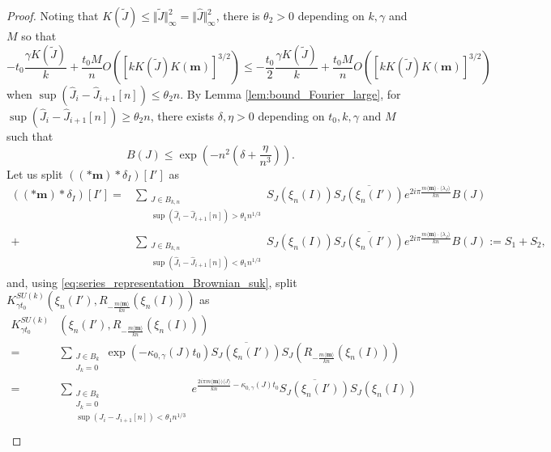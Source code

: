 \documentclass[10pt,11pt]{amsart}%
\begin{document}
\begin{proof}
Noting that $K(\tilde{J})\leq\Vert \tilde{J}\Vert_{\infty}^2=\Vert \hat{J}\Vert_{\infty}^2$, there is $\theta_2>0$ depending on $k,\gamma$ and $M$ so that 
$$-t_0\frac{\gamma K(\tilde{J})}{k}+\frac{t_0M}{n}O\left(\left[kK(\tilde{J})K(\mathbf{m})\right]^{3/2}\right)\leq -\frac{t_0}{2}\frac{\gamma K(\tilde{J})}{k}+\frac{t_0M}{n}O\left(\left[kK(\tilde{J})K(\mathbf{m})\right]^{3/2}\right)$$ 
when $\sup(\hat{J}_{i}-\hat{J}_{i+1} [n])\leq \theta_2n$. By Lemma \ref{lem:bound_Fourier_large}, for $\sup(\hat{J}_{i}-\hat{J}_{i+1} [n])\geq \theta_2n$, there exists $\delta,\eta>0$ depending on $t_0,k,\gamma$ and $M$ such that
\begin{equation}\label{eq:bound_Fourier_large_J}
B(J)\leq   \exp\left(-n^2\left(\delta+ \frac{\eta}{n^3}\right)\right).
\end{equation}
Let us split $\left(\left(\ast \mathbf{m}\right)\ast \delta_I\right)[I']$ as
\begin{align*}
\left(\left(\ast \mathbf{m}\right)\ast \delta_I\right)[I']=&\sum_{\substack{J\in B_{k,n}\\ \sup(\hat{J}_{i}-\hat{J}_{i+1} [n])> \theta_1 n^{1/3}}}S_{J}(\xi_{n}(I))\overline{S_{J}(\xi_{n}(I'))}e^{2i \pi \frac{m\langle\mathbf{m}\rangle\cdot\langle \lambda_J\rangle}{kn}}B(J)\\
+&\sum_{\substack{J\in B_{k,n}\\ \sup(\hat{J}_{i}-\hat{J}_{i+1} [n])< \theta_1 n^{1/3}}}S_{J}(\xi_{n}(I))\overline{S_{J}(\xi_{n}(I'))}e^{2i \pi \frac{m\langle\mathbf{m}\rangle\cdot\langle \lambda_J\rangle}{kn}}B(J):=S_1+S_2,
\end{align*}
and, using \eqref{eq:series_representation_Brownian_suk}, split $K^{SU(k)}_{\gamma t_0}\left(\xi_n(I'),R_{-\frac{m\langle\mathbf{m}\rangle}{kn}}\left(\xi_{n}\left(I\right)\right)\right)$ as 
\begin{align*}
K^{SU(k)}_{\gamma t_0}&\left(\xi_n(I'),R_{-\frac{m\langle\mathbf{m}\rangle}{kn}}\left(\xi_{n}\left(I\right)\right)\right)\\
=&\sum_{\substack{J\in  B_{k}\\J_k=0}}\exp(-\kappa_{0,\gamma}(J)t_0)\overline{S_{J}(\xi_{n}(I'))}S_{J}\left(R_{-\frac{m\langle\mathbf{m}\rangle}{kn}}\left(\xi_{n}\left(I\right)\right)\right)\\
=&\sum_{\substack{J\in  B_{k}\\J_k=0\\ \sup(J_{i}-J_{i+1} [n])<\theta_1 n^{1/3}}}e^{\frac{2i \pi m\langle\mathbf{m}\rangle)\langle J\rangle}{kn}-\kappa_{0,\gamma}(J)t_0}\overline{S_{J}(\xi_{n}(I'))}S_{J}(\xi_{n}(I))\\

\end{align*}
\end{proof}
\end{document}
